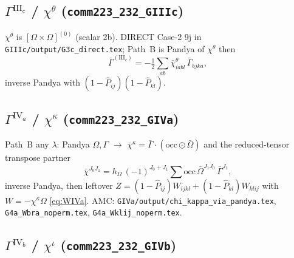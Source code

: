 \documentclass[enabledeprecatedfontcommands]{scrartcl}
\newcommand{\codename}[1]{\texttt{#1}}
\begin{document}
\subsection{$\Gamma^{\mathrm{III}_c}$ / $\chi^\theta$
(\codename{comm223\_232\_GIIIc})}
\label{sec:js-GIIIc}

$\chi^\theta$ is $[\Omega\times\Omega]^{(0)}$ (scalar 2b). DIRECT Case-2
9j in \codename{GIIIc/output/G3c\_direct.tex}; Path~B is Pandya of $\chi^\theta$ then
\begin{equation}\label{eq:js-GIIIc}
\bar\Gamma^{(\mathrm{III}_c)}
=-\tfrac12\sum_{ab}
\bar\chi^{\theta}_{iabl}\,\bar\Gamma_{bjka},
\end{equation}
inverse Pandya with $(1-\hat P_{ij})(1-\hat P_{kl})$.

\subsection{$\Gamma^{\mathrm{IV}_a}$ / $\chi^\kappa$
(\codename{comm223\_232\_GIVa})}
\label{sec:js-GIVa}

Path~B any $\lambda$: Pandya $\Omega,\Gamma$ $\to$
$\bar\chi^\kappa=\bar\Gamma\cdot(\mathrm{occ}\odot\bar\Omega)$ and the
reduced-tensor transpose partner
\begin{equation}\label{eq:js-chik-T}
\bar\chi^{J_0 J_1}
=h_\Omega\,(-1)^{J_0+J_1}
\sum\mathrm{occ}\,
\bar\Omega^{J_1 J_0}\,
\bar\Gamma^{J_1},
\end{equation}
inverse Pandya, then leftover
$Z=(1-\hat P_{ij})W_{ijkl}+(1-\hat P_{kl})W_{klij}$ with
$W=-\chi^\kappa\Omega$ \eqref{eq:WIVa}.
AMC: \codename{GIVa/output/chi\_kappa\_via\_pandya.tex}, \codename{G4a\_Wbra\_noperm.tex}, \codename{G4a\_Wklij\_noperm.tex}.

\subsection{$\Gamma^{\mathrm{IV}_b}$ / $\chi^\iota$
(\codename{comm223\_232\_GIVb})}
\label{sec:js-GIVb}
\end{document}
